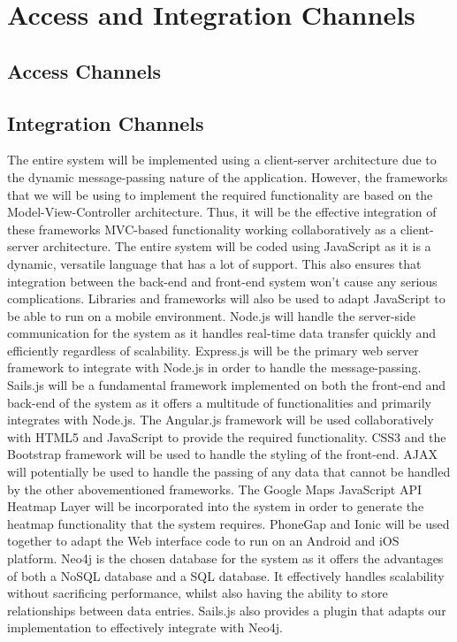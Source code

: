 \documentclass[11pt,fleqn]{book} %
\begin{document}
\chapter{Access and Integration Channels}

	\section{Access Channels}
	\section{Integration Channels}
	The entire system will be implemented using a client-server architecture due to the dynamic message-passing nature of the application. However, the frameworks that we will be using to implement the required functionality are based on the Model-View-Controller architecture. Thus, it will be the effective integration of these frameworks MVC-based functionality working collaboratively as a client-server architecture. The entire system will be coded using JavaScript as it is a dynamic, versatile language that has a lot of support. This also ensures that integration between the back-end and front-end system won’t cause any serious complications. Libraries and frameworks will also be used to adapt JavaScript to be able to run on a mobile environment.\newline\newline
	Node.js will handle the server-side communication for the system as it handles real-time data transfer quickly and efficiently regardless of scalability. Express.js will be the primary web server framework to integrate with Node.js in order to handle the message-passing. Sails.js will be a fundamental framework implemented on both the front-end and back-end of the system as it offers a multitude of functionalities and primarily integrates with Node.js. The Angular.js framework will be used collaboratively with HTML5 and JavaScript to provide the required functionality. CSS3 and the Bootstrap framework will be used to handle the styling of the front-end. AJAX will potentially be used to handle the passing of any data that cannot be handled by the other abovementioned frameworks. The Google Maps JavaScript API Heatmap Layer will be incorporated into the system in order to generate the heatmap functionality that the system requires. PhoneGap and Ionic will be used together to adapt the Web interface code to run on an Android  and iOS platform.\newline\newline
	Neo4j is the chosen database for the system as it offers the advantages of both a NoSQL database and a SQL database. It effectively handles scalability without sacrificing performance, whilst also having the ability to store relationships between data entries. Sails.js also provides a plugin that adapts our implementation to effectively integrate with Neo4j.
	
\end{document}
